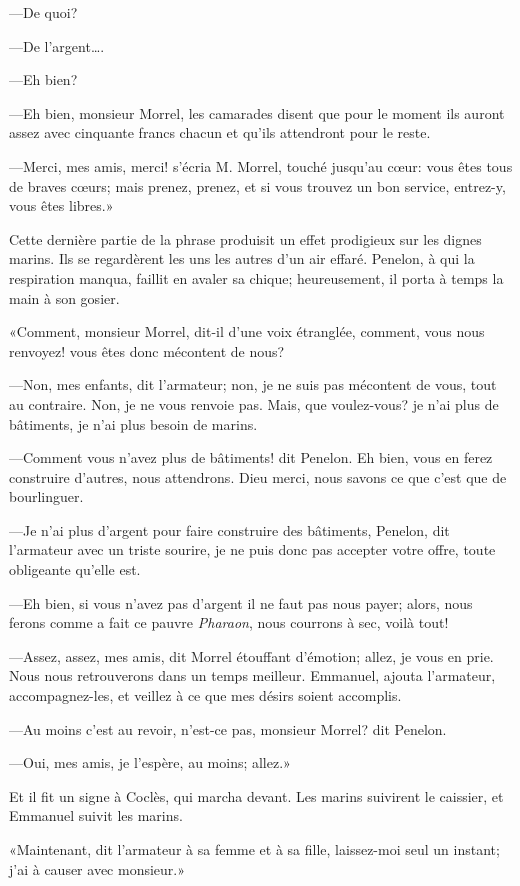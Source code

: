 —De quoi?

—De l'argent\dots.

—Eh bien?

—Eh bien, monsieur Morrel, les camarades disent que pour le moment ils auront assez avec cinquante francs chacun et qu'ils attendront pour le reste.

—Merci, mes amis, merci! s'écria M. Morrel, touché jusqu'au cœur: vous êtes tous de braves cœurs; mais prenez, prenez, et si vous trouvez un bon service, entrez-y, vous êtes libres.»

Cette dernière partie de la phrase produisit un effet prodigieux sur les dignes marins. Ils se regardèrent les uns les autres d'un air effaré. Penelon, à qui la respiration manqua, faillit en avaler sa chique; heureusement, il porta à temps la main à son gosier.

«Comment, monsieur Morrel, dit-il d'une voix étranglée, comment, vous nous renvoyez! vous êtes donc mécontent de nous?

—Non, mes enfants, dit l'armateur; non, je ne suis pas mécontent de vous, tout au contraire. Non, je ne vous renvoie pas. Mais, que voulez-vous? je n'ai plus de bâtiments, je n'ai plus besoin de marins.

—Comment vous n'avez plus de bâtiments! dit Penelon. Eh bien, vous en ferez construire d'autres, nous attendrons. Dieu merci, nous savons ce que c'est que de bourlinguer.

—Je n'ai plus d'argent pour faire construire des bâtiments, Penelon, dit l'armateur avec un triste sourire, je ne puis donc pas accepter votre offre, toute obligeante qu'elle est.

—Eh bien, si vous n'avez pas d'argent il ne faut pas nous payer; alors, nous ferons comme a fait ce pauvre \textit{Pharaon}, nous courrons à sec, voilà tout!

—Assez, assez, mes amis, dit Morrel étouffant d'émotion; allez, je vous en prie. Nous nous retrouverons dans un temps meilleur. Emmanuel, ajouta l'armateur, accompagnez-les, et veillez à ce que mes désirs soient accomplis.

—Au moins c'est au revoir, n'est-ce pas, monsieur Morrel? dit Penelon.

—Oui, mes amis, je l'espère, au moins; allez.»

Et il fit un signe à Coclès, qui marcha devant. Les marins suivirent le caissier, et Emmanuel suivit les marins.

«Maintenant, dit l'armateur à sa femme et à sa fille, laissez-moi seul un instant; j'ai à causer avec monsieur.»

